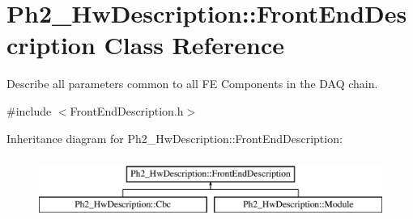 \hypertarget{class_ph2___hw_description_1_1_front_end_description}{\section{Ph2\-\_\-\-Hw\-Description\-:\-:Front\-End\-Description Class Reference}
\label{class_ph2___hw_description_1_1_front_end_description}
}


Describe all parameters common to all F\-E Components in the D\-A\-Q chain.  




{\ttfamily \#include $<$Front\-End\-Description.\-h$>$}

Inheritance diagram for Ph2\-\_\-\-Hw\-Description\-:\-:Front\-End\-Description\-:\begin{figure}[H]
\begin{center}
\leavevmode
\includegraphics[height=2.000000cm]{class_ph2___hw_description_1_1_front_end_description}
\end{center}
\end{figure}
